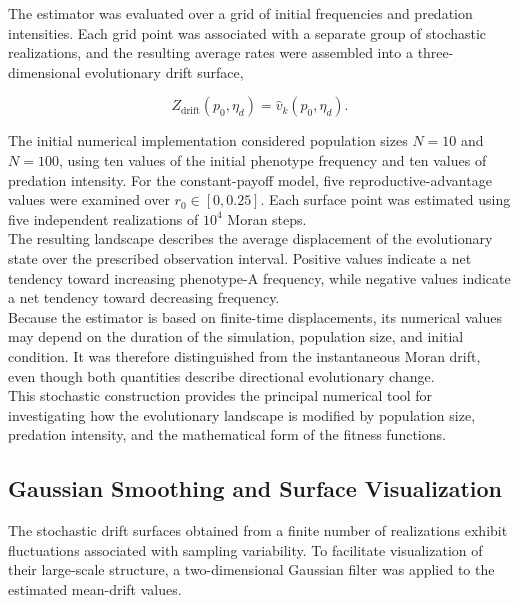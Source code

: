 The estimator was evaluated over a grid of initial frequencies and predation intensities. Each grid point was associated with a separate group of stochastic realizations, and the resulting average rates were assembled into a three-dimensional evolutionary drift surface,

\begin{equation}
Z_{\mathrm{drift}}(p_0,\eta_d)
=
\widehat v_k(p_0,\eta_d).
\label{eq:method_empirical_drift_surface}
\end{equation}

The initial numerical implementation considered population sizes \(N=10\) and \(N=100\), using ten values of the initial phenotype frequency and ten values of predation intensity. For the constant-payoff model, five reproductive-advantage values were examined over \(r_0\in[0,0.25]\). Each surface point was estimated using five independent realizations of \(10^4\) Moran steps. \\

The resulting landscape describes the average displacement of the evolutionary state over the prescribed observation interval. Positive values indicate a net tendency toward increasing phenotype-A frequency, while negative values indicate a net tendency toward decreasing frequency. \\ 

Because the estimator is based on finite-time displacements, its numerical values may depend on the duration of the simulation, population size, and initial condition. It was therefore distinguished from the instantaneous Moran drift, even though both quantities describe directional evolutionary change. \\ 

This stochastic construction provides the principal numerical tool for investigating how the evolutionary landscape is modified by population size, predation intensity, and the mathematical form of the fitness functions.


\subsection{Gaussian Smoothing and Surface Visualization}
\label{sec:landscape_visualization}

The stochastic drift surfaces obtained from a finite number of realizations exhibit fluctuations associated with sampling variability. To facilitate visualization of their large-scale structure, a two-dimensional Gaussian filter was applied to the estimated mean-drift values. \\ 

